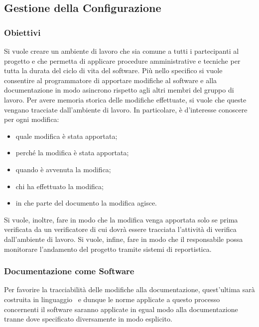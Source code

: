 \subsection{Gestione della Configurazione}
    \subsubsection{Obiettivi}
    Si vuole creare un ambiente di lavoro che sia comune a tutti i partecipanti al progetto e che permetta di applicare procedure amministrative e tecniche per tutta la durata del ciclo di vita del software. Più nello specifico si vuole consentire al programmatore di apportare modifiche al software e alla documentazione in modo asincrono rispetto agli altri membri del gruppo di lavoro. Per avere memoria storica delle modifiche effettuate, si vuole che queste vengano tracciate dall'ambiente di lavoro. In particolare, è d'interesse conoscere per ogni modifica:
    \begin{itemize}
        \item quale modifica è stata apportata;
        \item perché la modifica è stata apportata;
        \item quando è avvenuta la modifica;
        \item chi ha effettuato la modifica;
        \item in che parte del documento la modifica agisce.
    \end{itemize}
    Si vuole, inoltre, fare in modo che la modifica venga apportata solo se prima verificata da un verificatore di cui dovrà essere tracciata l'attività di verifica dall'ambiente di lavoro. Si vuole, infine, fare in modo che il responsabile possa monitorare l'andamento del progetto tramite sistemi di reportistica.

    \subsubsection{Documentazione come Software}
    Per favorire la tracciabilità delle modifiche alla documentazione, quest'ultima sarà costruita in linguaggio \glock{\LaTeX}\ e dunque le norme applicate a questo processo concernenti il software saranno applicate in egual modo alla documentazione tranne dove specificato diversamente in modo esplicito.

